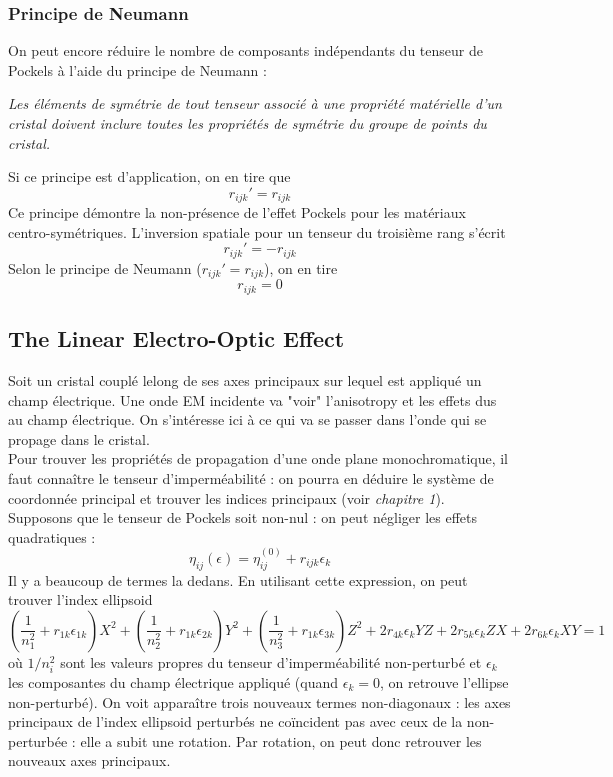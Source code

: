 \subsubsection{Principe de Neumann}
On peut encore réduire le nombre de composants indépendants du tenseur de Pockels à l'aide du 
principe de Neumann :
\begin{center}
\textit{Les éléments de symétrie de tout tenseur associé à une propriété matérielle d'un cristal doivent inclure toutes les propriétés de symétrie du groupe de points du cristal.}
\end{center}
Si ce principe est d'application, on en tire que
\begin{equation}
r_{ijk}' = r_{ijk}
\end{equation}
Ce principe démontre la non-présence de l'effet Pockels pour les matériaux centro-symétriques. L'inversion
spatiale pour un tenseur du troisième rang s'écrit 
\begin{equation}
r_{ijk}' = -r_{ijk}
\end{equation}
Selon le principe de Neumann ($r_{ijk}' = r_{ijk}$), on en tire
\begin{equation}
r_{ijk}=0
\end{equation}

\subsection{The Linear Electro-Optic Effect}
Soit un cristal couplé lelong de ses axes principaux sur lequel est appliqué un champ électrique. Une
onde EM incidente va "voir" l'anisotropy et les effets dus au champ électrique. On s'intéresse ici à 
ce qui va se passer dans l'onde qui se propage dans le cristal. \\

Pour trouver les propriétés de propagation d'une onde plane monochromatique, il faut connaître le
tenseur d'imperméabilité : on pourra en déduire le système de coordonnée principal et trouver les 
indices principaux (voir \textit{chapitre 1}). Supposons que le tenseur de Pockels soit non-nul : 
on peut négliger les effets quadratiques :
\begin{equation}
\eta_{ij}(\epsilon) = \eta_{ij}^{(0)}+r_{ijk}\epsilon_k
\end{equation}
Il y a beaucoup de termes la dedans. En utilisant cette expression, on peut trouver l'index ellipsoid
\begin{equation}
\left(\dfrac{1}{n^2_1}+r_{1k}\epsilon_{1k}\right)X^2+
\left(\dfrac{1}{n^2_2}+r_{1k}\epsilon_{2k}\right)Y^2+
\left(\dfrac{1}{n^2_3}+r_{1k}\epsilon_{3k}\right)Z^2+ 
2r_{4k}\epsilon_kYZ + 2r_{5k}\epsilon_kZX+2r_{6k}\epsilon_kXY=1
\label{eq:6.11}
\end{equation}
où $1/n_i^2$ sont les valeurs propres du tenseur d'imperméabilité non-perturbé et $\epsilon_k$ les composantes
du champ électrique appliqué (quand $\epsilon_k=0$, on retrouve l'ellipse non-perturbé). On voit apparaître
trois nouveaux termes non-diagonaux : les axes principaux de l'index ellipsoid perturbés ne coïncident pas avec
ceux de la non-perturbée : elle a subit une rotation. Par rotation, on peut donc retrouver les nouveaux axes
principaux. 

